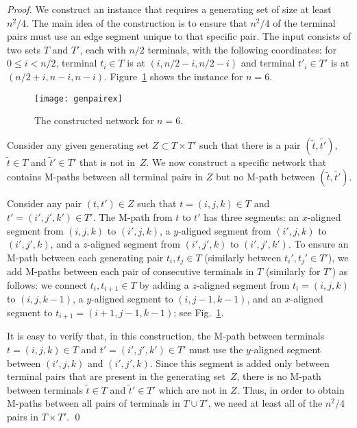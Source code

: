 \documentclass[11pt]{llncs}
\newenvironment{pf}{\begin{proof}}{\qed\end{proof}}
\begin{document}
\begin{pf}
  We construct an instance that requires a generating set of size at
  least $n^2/4$. The main idea of the construction is to ensure that
  $n^2/4$ of the terminal pairs must use an edge segment unique to
  that specific pair.  The input consists of two sets $T$ and $T'$,
  each with $n/2$ terminals, with the following coordinates: for $0\le
  i < {n}/{2}$, terminal $t_i \in T$ is at $(i, {n}/{2} -i,
  {n}/{2} -i)$ and terminal $t'_i \in T'$ is at $({n}/{2}+i,
  n-i, n-i)$.  Figure~\ref{fig:genpairex} shows the instance for
  $n=6$.

  \begin{figure}
    \centering
    \texttt{[image: genpairex]}
    \caption{The constructed network for $n=6$.}
    \label{fig:genpairex}
  \end{figure}
  Consider any given generating set
  $Z \subset T \times T'$ such that there is a pair $(\tilde{t}, \tilde{t'})$, 
  $\tilde{t}\in T$ and $\tilde{t}'\in T'$ that is not in~$Z$.
  We now construct a specific network that contains M-paths between all 
  terminal pairs in $Z$ but no M-path between $(\tilde{t}, \tilde{t'})$.
  
  Consider any pair $(t,t')\in Z$ such that $t=(i,j,k) \in T$ and
  $t'=(i',j',k') \in T'$.  The
  M-path from $t$ to $t'$ has three segments: an $x$-aligned segment 
  from $(i,j,k)$ to $(i',j,k)$, a $y$-aligned segment 
  from $(i',j,k)$ to $(i',j',k)$, and a $z$-aligned segment 
  from $(i',j', k)$ to $(i',j',k')$. To ensure an M-path between
  each generating pair $t_i, t_j \in T$ (similarly between
  $t_i', t_j' \in T'$), we add M-paths between each pair of
  consecutive terminals in $T$ (similarly for $T'$) as follows:
  we connect $t_i, t_{i+1} \in T$ 
by adding a $z$-aligned segment from $t_i=(i,j,k)$ to $(i,j,k-1)$, a
  $y$-aligned segment to $(i,j-1,k-1)$, and an $x$-aligned segment to
  $t_{i+1}=(i+1,j-1,k-1)$; see Fig.~\ref{fig:genpairex}.

  It is easy to verify that, in this construction, the M-path between
  terminals $t = (i,j,k) \in T$ and $t' = (i',j',k') \in T'$ must use
  the $y$-aligned segment between $(i',j,k)$ and
  $(i',j',k)$.  Since this segment is added only between terminal
  pairs that are present in the generating set~$Z$, there is no
  M-path between terminals $\tilde{t}\in T$ and $\tilde{t}'\in T'$
  which are not in $Z$. Thus, in order to obtain M-paths between all
  pairs of terminals in $T \cup T'$, we need at least all of the
  ${n^2}/{4}$ pairs in $T \times T'$.
\end{pf}
\end{document}
